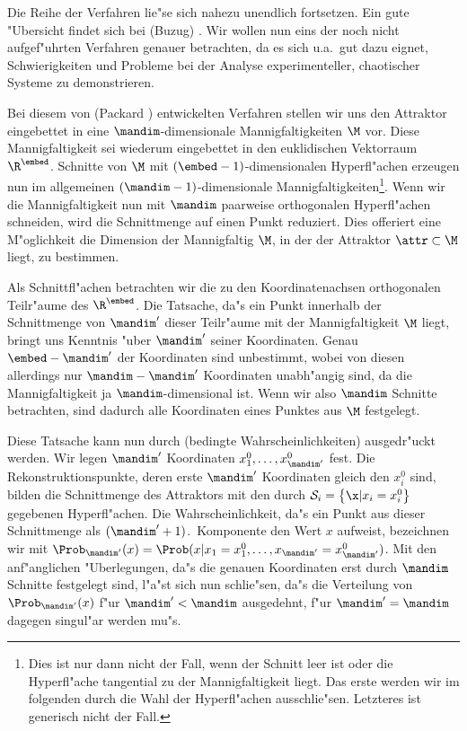 Die Reihe der Verfahren lie"se sich nahezu unendlich fortsetzen. Ein gute "Ubersicht
findet sich bei \autor(Buzug) \cite{Buzug94}. Wir wollen nun eins der noch nicht
aufgef"uhrten Verfahren genauer betrachten, da es sich u.a.\ gut dazu eignet,
Schwierigkeiten und Probleme bei der Analyse experimenteller, chaotischer Systeme zu
demonstrieren.

Bei diesem von \autor(Packard \etal) \cite{packard80} entwickelten Verfahren stellen wir
uns den Attraktor eingebettet in eine $\mandim$-dimensionale Mannigfaltigkeiten $\M$ vor.
Diese Mannigfaltigkeit sei wiederum eingebettet in den euklidischen Vektorraum
$\R^\embed$.  Schnitte von $\M$ mit $(\embed-1)$-di\-men\-sio\-nalen Hyperfl"achen
erzeugen nun im allgemeinen $(\mandim-1)$-dimensionale Mannigfaltigkeiten\footnote{Dies
  ist nur dann nicht der Fall, wenn der Schnitt leer ist oder die Hyperfl"ache tangential
  zu der Mannigfaltigkeit liegt.  Das erste werden wir im folgenden durch die Wahl der
  Hyperfl"achen ausschlie"sen. Letzteres ist generisch nicht der Fall.}.  Wenn wir die
Mannigfaltigkeit nun mit $\mandim$ paarweise orthogonalen Hyperfl"achen schneiden, wird
die Schnittmenge auf einen Punkt reduziert. Dies offeriert eine M"oglichkeit die Dimension
der Mannigfaltig $\M$, in der der Attraktor $\attr\subset\M$ liegt, zu bestimmen.

Als Schnittfl"achen betrachten wir die zu den Koordinatenachsen orthogonalen Teil\-r"aume
des $\R^\embed$. Die Tatsache, da"s ein Punkt innerhalb der Schnittmenge von $\mandim'$
dieser Teil\-r"aume mit der Mannigfaltigkeit $\M$ liegt, bringt uns Kenntnis "uber
$\mandim'$ seiner Koordinaten. Genau $\embed-\mandim'$ der Koordinaten sind unbestimmt,
wobei von diesen allerdings nur $\mandim-\mandim'$ Koordinaten unabh"angig sind, da die
Mannigfaltigkeit ja $\mandim$-dimensional ist. Wenn wir also $\mandim$ Schnitte
betrachten, sind dadurch alle Koordinaten eines Punktes aus $\M$ festgelegt.

Diese Tatsache kann nun durch \begriff(bedingte Wahrscheinlichkeiten) ausgedr"uckt werden.
Wir legen $\mandim'$ Koordinaten $x^0_1,\dots,x^0_{\mandim'}$ fest. Die
Rekonstruktionspunkte, deren erste $\mandim'$ Koordinaten gleich den $x^0_i$ sind, bilden
die Schnittmenge des Attraktors mit den durch $\mathcal{S}_i=\left\{ \x \vert
  x_i=x^0_i\right\}$ gegebenen Hyperfl"achen. Die Wahrscheinlichkeit, da"s ein Punkt aus
dieser Schnittmenge als $(\mandim'+1)$.\ Komponente den Wert $x$ aufweist, bezeichnen wir
mit $\Prob_{\mandim'}(x)=\Prob(x\vert x_1=x^0_1,\dots,x_{\mandim'}=x^0_{\mandim'})$. Mit
den anf"anglichen "Uberlegungen, da"s die genauen Koordinaten erst durch $\mandim$
Schnitte festgelegt sind, l"a"st sich nun schlie"sen, da"s die Verteilung von
$\Prob_{\mandim'}(x)$ f"ur $\mandim'<\mandim$ ausgedehnt, f"ur $\mandim'=\mandim$ dagegen
singul"ar werden mu"s.


